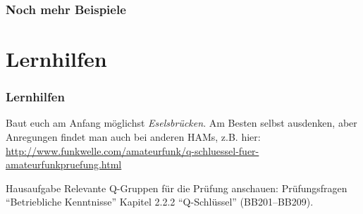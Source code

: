 \begin{frame}
    \frametitle{Noch mehr Beispiele}
    




\end{frame}

\section*{Lernhilfen}

\begin{frame}
    \frametitle{Lernhilfen}

    Baut euch am Anfang möglichst \emph{Eselsbrücken}. Am Besten selbst
    ausdenken, aber Anregungen findet man auch bei anderen HAMs, z.B. hier: \\[2em]

    \url{http://www.funkwelle.com/amateurfunk/q-schluessel-fuer-amateurfunkpruefung.html}
\end{frame}

\begin{frame}
  \begin{alertblock}{Hausaufgabe}
    Relevante Q-Gruppen für die Prüfung anschauen: Prüfungsfragen ``Betriebliche Kenntnisse'' Kapitel 2.2.2 ``Q-Schlüssel'' (BB201--BB209).
  \end{alertblock}
\end{frame}

